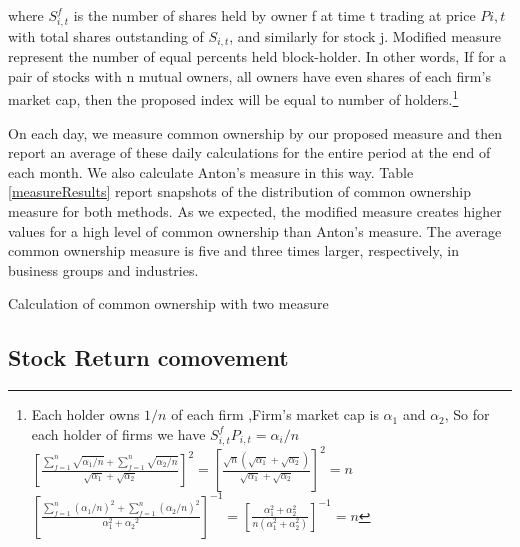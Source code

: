where $ S^f_{i,t}$ is the number of shares held by owner f
at time t trading at price $ P{i,t} $ with total shares outstanding of $ S_{i,t} $, and similarly for stock j. Modified measure represent the number of equal percents held block-holder. In other words, If for a pair of stocks with n mutual owners, all owners have even shares of each firm's market cap, then the proposed index will be equal to number of holders.\footnote{ \tiny
	Each holder owns $ 1/n $ of each firm ,Firm's market cap is $ \alpha_1 $ and $ \alpha_2 $, So for each holder of firms we have $ S^f_{i,t}P_{i,t} = \alpha_i/n $\\
	$
	[  \frac{\sum_{f=1}^{n} \sqrt{\alpha_1/n}+\sum_{f=1}^{n} \sqrt{\alpha_2/n}}{\sqrt{\alpha_1} + \sqrt{\alpha_2}}]^2 
	= [\frac{\sqrt{n}(\sqrt{\alpha_1} +\sqrt{\alpha_2 })}{\sqrt{\alpha_1} + \sqrt{\alpha_2}}]^2 = n $
	\\
	$
	[\frac{\sum_{f=1}^{n} {(\alpha_1/n)^2}+\sum_{f=1}^{n} {(\alpha_2/n)^2}}{\alpha_1^2 +{\alpha_2}^2}]^{-1} = [\frac{{\alpha_1^2 + \alpha_2^2 }}{n(\alpha_1^2 + \alpha_2^2)}]^{-1} = n
	$
}

On each day, we measure common ownership by our proposed measure and then report an average of these daily calculations for the entire period at the end of each month. We also calculate Anton's measure in this way. Table \ref{measureResults} report snapshots of the distribution of common ownership measure for both methods. As we expected, the modified measure creates higher values for a high level of common ownership than Anton's measure. The average common ownership measure is five and three times larger, respectively, in business groups and industries.
		\begin{table}[htbp]
			\caption{Calculation of common ownership with two measure}
			\label{measureResults}
			\resizebox{1\textwidth}{!}
			{
					{}
			}
		\end{table}
\FloatBarrier
\subsection{{Stock Return comovement}}
\label{comovement}

